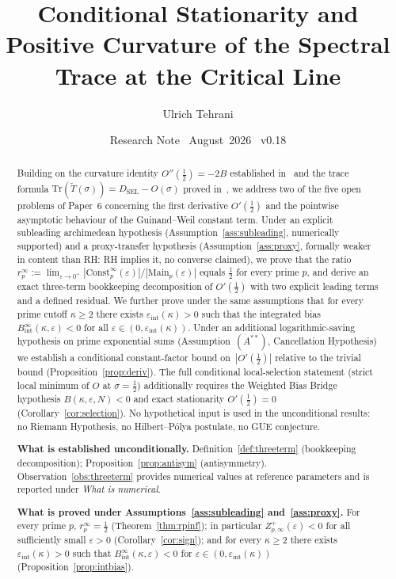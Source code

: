 \documentclass[11pt]{article}
\title{\vspace{-1.5em}\bfseries Conditional Stationarity and Positive
Curvature of the Spectral Trace at the Critical Line}
\author{Ulrich Tehrani}
\date{Research Note \textperiodcentered\ August~2026
      \textperiodcentered\ v0.18}
\newcommand{\Tt}{\widetilde{T}}
\newcommand{\DSEL}{D_{\mathrm{SEL}}}
\newcommand{\Astar}{\ensuremath{(A^{**})}}  %
\begin{document}
\maketitle

\begin{abstract}
Building on the curvature identity $O''(\tfrac12)=-2B$ established
in~\cite{Paper6} and the trace formula $\mathrm{Tr}(\Tt(\sigma))=\DSEL-O(\sigma)$
proved in~\cite{Paper5}, we address two of the five open problems
of Paper~6 concerning the first derivative $O'(\tfrac12)$ and the
pointwise asymptotic behaviour of the Guinand--Weil constant term.
Under an explicit subleading archimedean hypothesis
(Assumption~\ref{ass:subleading}, numerically supported) and a
proxy-transfer hypothesis (Assumption~\ref{ass:proxy},
formally weaker in content than RH: RH implies it, no converse claimed),
we prove that the ratio $r_p^\infty := \lim_{\varepsilon\to 0^+}
|\mathrm{Const}_p^\infty(\varepsilon)|/|\mathrm{Main}_p(\varepsilon)|$ equals
$\tfrac12$ for every prime $p$, and derive an exact
three-term bookkeeping decomposition of $O'(\tfrac12)$
with two explicit leading terms and a defined residual.
We further prove under the same assumptions that for every prime cutoff
$\kappa\ge 2$ there exists $\varepsilon_{\mathrm{int}}(\kappa)>0$ such that the
integrated bias $B_{\mathrm{int}}^\infty(\kappa,\varepsilon)<0$ for all
$\varepsilon\in(0,\varepsilon_{\mathrm{int}}(\kappa))$.
Under an additional logarithmic-saving hypothesis on prime exponential sums
(Assumption~\Astar, Cancellation Hypothesis) we establish a conditional
constant-factor bound on~$|O'(\tfrac12)|$ relative to the trivial bound
(Proposition~\ref{prop:deriv}).
The full conditional local-selection statement (strict local minimum of
$O$ at $\sigma=\tfrac12$) additionally requires the Weighted Bias Bridge
hypothesis $B(\kappa,\varepsilon,N)<0$ and exact stationarity
$O'(\tfrac12)=0$ (Corollary~\ref{cor:selection}).
No hypothetical input is used in the unconditional results: no Riemann
Hypothesis, no Hilbert--P\'olya postulate, no GUE conjecture.

\textbf{What is established unconditionally.}
Definition~\ref{def:threeterm} (bookkeeping decomposition);
Proposition~\ref{prop:antisym} (antisymmetry).
Observation~\ref{obs:threeterm} provides numerical values at
reference parameters and is reported under \emph{What is numerical}.

\textbf{What is proved under Assumptions~\ref{ass:subleading} and~\ref{ass:proxy}.}
For every prime $p$, $r_p^\infty = \tfrac12$ (Theorem~\ref{thm:rpinf});
in particular $Z_{p,\infty}^+(\varepsilon)<0$ for all sufficiently small
$\varepsilon>0$ (Corollary~\ref{cor:sign});
and for every $\kappa\ge 2$ there exists $\varepsilon_{\mathrm{int}}(\kappa)>0$
such that $B_{\mathrm{int}}^\infty(\kappa,\varepsilon)<0$ for
$\varepsilon\in(0,\varepsilon_{\mathrm{int}}(\kappa))$
(Proposition~\ref{prop:intbias}).


\end{abstract}
\end{document}

